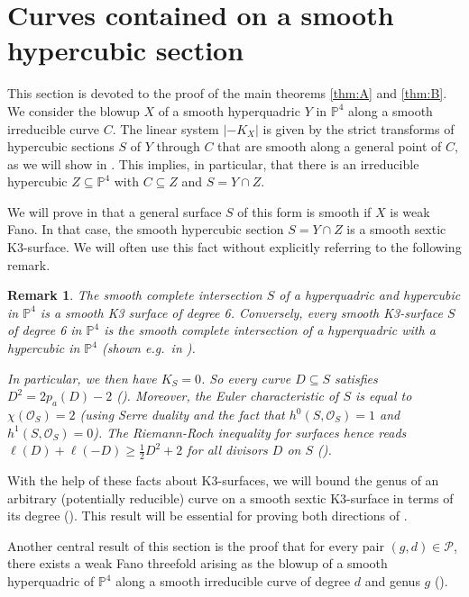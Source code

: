 \documentclass[english,11pt,reqno]{amsart}
\newcommand{\sub}{\subseteq}
\newcommand{\Pfour}{\mathbb{P}^4}
\newtheorem{rmk}[thm]{Remark}
\begin{document}
\section{Curves contained on a smooth hypercubic section} \label{section:hypercubic}
%
This section is devoted to the proof of the main theorems \ref{thm:A} and \ref{thm:B}. We consider the blowup $X$ of a smooth hyperquadric $Y$ in $\Pfour$ along a smooth irreducible curve $C$. The linear system $|-K_X|$ is given by the strict transforms of hypercubic sections $S$ of $Y$ through $C$ that are smooth along a general point of $C$, as we will show in . This implies, in particular, that there is an irreducible hypercubic $Z\sub \Pfour$ with $C\sub Z$ and $S=Y\cap Z$. \par
We will prove in  that a general surface $S$ of this form is smooth if $X$ is weak Fano. In that case, the smooth hypercubic section $S=Y\cap Z$ is a smooth sextic K3-surface. We will often use this fact without explicitly referring to the following remark. 
%
\begin{rmk} \label{rmk:Riemann_Roch_formula}
The smooth complete intersection $S$ of a hyperquadric and hypercubic in $\Pfour$ is a smooth K3 surface of degree 6. Conversely, every smooth K3-surface $S$ of degree 6 in $\Pfour$ is the smooth complete intersection of a hyperquadric with a hypercubic in $\Pfour$ (shown e.g.\ in \cite[Chapter 4.5, p.\ 592]{Griffiths_Harris_Principles_of_Alg_Geom}). \par 
In particular, we then have $K_S = 0$. So every curve $D\sub S$ satisfies $D^2=2p_a(D)-2$ ().
Moreover, the Euler characteristic of $S$ is equal to $\chi(\mathcal{O}_S)=2$ (using Serre duality and the fact that $h^0(S,\mathcal{O}_S)=1$ and $h^1(S,\mathcal{O}_S)=0$). The Riemann-Roch inequality for surfaces hence reads $ \ell(D) + \ell(-D) \geq \frac{1}{2} D^2 + 2$ for all divisors $D$ on $S$ (\cite[Chapter 4, Section 2.4]{Shafarevich_Basic_Alg_Geom_1}).\par 
\end{rmk}
With the help of these facts about K3-surfaces, we will bound the genus of an arbitrary (potentially reducible) curve on a smooth sextic K3-surface in terms of its degree (). This result will be essential for proving both directions of . \par 
Another central result of this section is the proof that for every pair $(g,d)\in\mathcal{P}$, there exists a weak Fano threefold arising as the blowup of a smooth hyperquadric of $\Pfour$ along a smooth irreducible curve of degree $d$ and genus $g$ (). 
%
%
%
\end{document}
